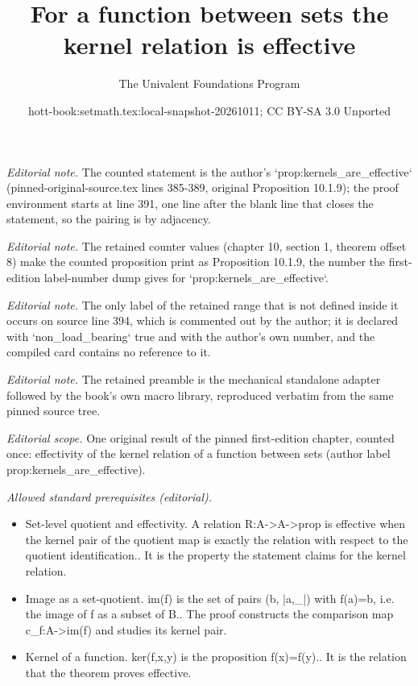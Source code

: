 \documentclass[10pt,a4paper]{article}
\title{For a function between sets the kernel relation is effective}
\author{The Univalent Foundations Program}
\date{hott-book:setmath.tex:local-snapshot-20261011; CC BY-SA 3.0 Unported}
\newcounter{chapter}
\theoremstyle{definition}
\theoremstyle{remark}
\numberwithin{equation}{section}
\begin{document}
\maketitle
\setcounter{chapter}{10}
\setcounter{section}{1}
\setcounter{thm}{8}
\noindent\textit{Editorial note.} The counted statement is the author's `prop:kernels\_are\_effective` (pinned-original-source.tex lines 385-389, original Proposition 10.1.9); the proof environment starts at line 391, one line after the blank line that closes the statement, so the pairing is by adjacency.\par\medskip
\noindent\textit{Editorial note.} The retained counter values (chapter 10, section 1, theorem offset 8) make the counted proposition print as Proposition 10.1.9, the number the first-edition label-number dump gives for `prop:kernels\_are\_effective`.\par\medskip
\noindent\textit{Editorial note.} The only label of the retained range that is not defined inside it occurs on source line 394, which is commented out by the author; it is declared with `non\_load\_bearing` true and with the author's own number, and the compiled card contains no reference to it.\par\medskip
\noindent\textit{Editorial note.} The retained preamble is the mechanical standalone adapter followed by the book's own macro library, reproduced verbatim from the same pinned source tree.\par\medskip
\noindent\textit{Editorial scope.} One original result of the pinned first-edition chapter, counted once: effectivity of the kernel relation of a function between sets (author label prop:kernels\_are\_effective).\par\medskip
\noindent\textit{Allowed standard prerequisites (editorial).}\begin{itemize}
\item Set-level quotient and effectivity. A relation R:A->A->prop is effective when the kernel pair of the quotient map is exactly the relation with respect to the quotient identification.. It is the property the statement claims for the kernel relation.
\item Image as a set-quotient. im(f) is the set of pairs (b, |a,\_|) with f(a)=b, i.e. the image of f as a subset of B.. The proof constructs the comparison map c\_f:A->im(f) and studies its kernel pair.
\item Kernel of a function. ker(f,x,y) is the proposition f(x)=f(y).. It is the relation that the theorem proves effective.
\end{itemize}\medskip
\end{document}
